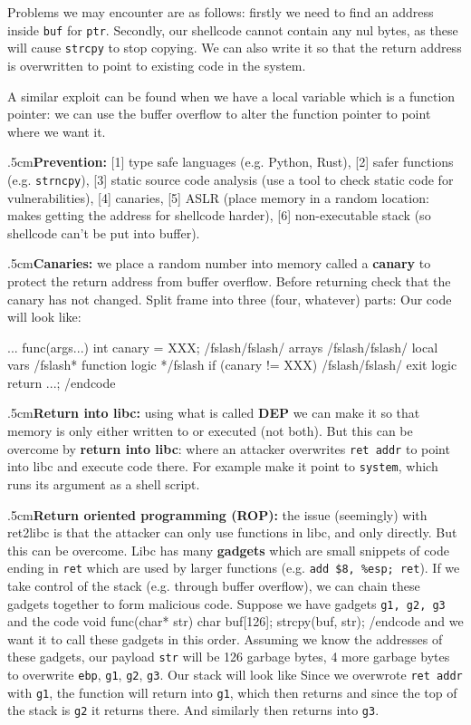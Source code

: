 Problems we may encounter are as follows: firstly we need to find an address inside {\tt buf} for {\tt ptr}.
Secondly, our shellcode cannot contain any nul bytes, as these will cause {\tt strcpy} to stop copying.
We can also write it so that the return address is overwritten to point to existing code in the system.

A similar exploit can be found when we have a local variable which is a function pointer: we can use the buffer overflow to alter the function pointer to point where we want it.

\quitvmode\kern.5cm{\bf Prevention:} [1] type safe languages (e.g. Python, Rust), [2] safer functions (e.g. {\tt strncpy}), [3] static source code analysis (use a tool to check static code for
vulnerabilities), [4] canaries, [5] ASLR (place memory in a random location: makes getting the address for shellcode harder), [6] non-executable stack (so shellcode can't be put into buffer).

\quitvmode\kern.5cm{\bf Canaries:} we place a random number into memory called a {\bf canary} to protect the return address from buffer overflow.
Before returning check that the canary has not changed.
Split frame into three (four, whatever) parts:
Our code will look like:

\begincode
... func(args...) {
    int canary = XXX;
    /fslash/fslash/ arrays
    /fslash/fslash/ local vars
    /fslash* function logic */fslash
    if (canary != XXX) /fslash/fslash/ exit logic
    return ...;
}
/endcode

\quitvmode\kern.5cm{\bf Return into libc:} using what is called {\bf DEP} we can make it so that memory is only either written to or executed (not both).
But this can be overcome by {\bf return into libc}: where an attacker overwrites {\tt ret addr} to point into libc and execute code there.
For example make it point to {\tt system}, which runs its argument as a shell script.

\quitvmode\kern.5cm{\bf Return oriented programming (ROP):} the issue (seemingly) with ret2libc is that the attacker can only use functions in libc, and only directly.
But this can be overcome.
Libc has many {\bf gadgets} which are small snippets of code ending in {\tt ret} which are used by larger functions (e.g. {\tt add \$8, \%esp; ret}).
If we take control of the stack (e.g. through buffer overflow), we can chain these gadgets together to form malicious code.
Suppose we have gadgets {\tt g1, g2, g3} and the code
\begincode
void func(char* str) {
    char buf[126];
    strcpy(buf, str);
}
/endcode
and we want it to call these gadgets in this order.
Assuming we know the addresses of these gadgets, our payload {\tt str} will be 126 garbage bytes, 4 more garbage bytes to overwrite {\tt ebp}, {\tt g1}, {\tt g2}, {\tt g3}.
Our stack will look like
Since we overwrote {\tt ret addr} with {\tt g1}, the function will return into {\tt g1}, which then returns and since the top of the stack is {\tt g2} it returns there.
And similarly then returns into {\tt g3}.

